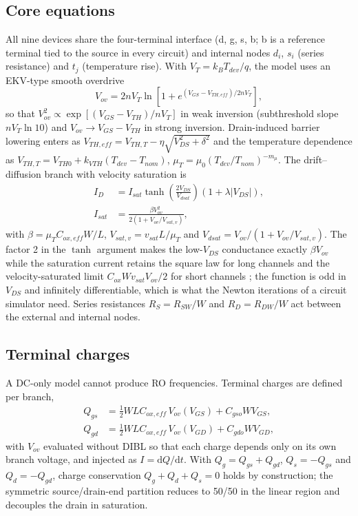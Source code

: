 \documentclass[journal]{IEEEtran}
\begin{document}
\subsection{Core equations}
All nine devices share the four-terminal interface (d, g, s, b; b is a reference terminal tied to the source in every circuit) and internal nodes $d_i$, $s_i$ (series resistance) and $t_j$ (temperature rise). With $V_T = k_BT_{dev}/q$, the model uses an EKV-type smooth overdrive \cite{Enz1995}
\begin{equation}
V_{ov} = 2nV_T \ln\!\left[1+e^{(V_{GS}-V_{TH,eff})/2nV_T}\right],
\label{eq:vov}
\end{equation}
so that $V_{ov}^2 \propto \exp[(V_{GS}-V_{TH})/nV_T]$ in weak inversion (subthreshold slope $nV_T\ln 10$) and $V_{ov}\to V_{GS}-V_{TH}$ in strong inversion. Drain-induced barrier lowering enters as $V_{TH,eff} = V_{TH,T} - \eta\sqrt{V_{DS}^2+\delta^2}$ and the temperature dependence as $V_{TH,T} = V_{TH0}+k_{VTH}(T_{dev}-T_{nom})$, $\mu_T=\mu_0(T_{dev}/T_{nom})^{-m_\mu}$. The drift--diffusion branch with velocity saturation is
\begin{align}
I_D &= I_{sat}\tanh\!\left(\frac{2V_{DS}}{V_{dsat}}\right)\left(1+\lambda|V_{DS}|\right),\nonumber\\
I_{sat} &= \frac{\beta V_{ov}^2}{2\left(1+V_{ov}/V_{sat,v}\right)},
\label{eq:id}
\end{align}
with $\beta=\mu_T C_{ox,eff}W/L$, $V_{sat,v}=v_{sat}L/\mu_T$ and $V_{dsat}=V_{ov}/(1+V_{ov}/V_{sat,v})$. The factor 2 in the $\tanh$ argument makes the low-$V_{DS}$ conductance exactly $\beta V_{ov}$ while the saturation current retains the square law for long channels and the velocity-saturated limit $C_{ox}Wv_{sat}V_{ov}/2$ for short channels \cite{Lundstrom2002}; the function is odd in $V_{DS}$ and infinitely differentiable, which is what the Newton iterations of a circuit simulator need. Series resistances $R_S=R_{SW}/W$ and $R_D=R_{DW}/W$ act between the external and internal nodes.

\subsection{Terminal charges}
A DC-only model cannot produce RO frequencies. Terminal charges are defined per branch,
\begin{align}
Q_{gs} &= \tfrac12 WLC_{ox,eff}\,V_{ov}(V_{GS}) + C_{gso}WV_{GS},\\
Q_{gd} &= \tfrac12 WLC_{ox,eff}\,V_{ov}(V_{GD}) + C_{gdo}WV_{GD},
\end{align}
with $V_{ov}$ evaluated without DIBL so that each charge depends only on its own branch voltage, and injected as $I=\mathrm{d}Q/\mathrm{d}t$. With $Q_g=Q_{gs}+Q_{gd}$, $Q_s=-Q_{gs}$ and $Q_d=-Q_{gd}$, charge conservation $Q_g+Q_d+Q_s=0$ holds by construction; the symmetric source/drain-end partition reduces to 50/50 in the linear region and decouples the drain in saturation.
\end{document}
